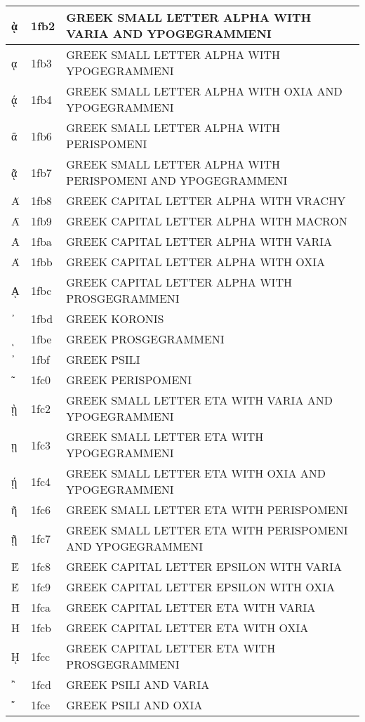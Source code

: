 \documentclass[12pt,letterpaper,openany]{book}
\begin{document}
\begin{center}
\begin{supertabular}{|m{0.25in}|m{0.5in}|m{4in}|}
			ᾲ & 1fb2 & GREEK SMALL LETTER ALPHA WITH VARIA AND YPOGEGRAMMENI\\\hline
			ᾳ & 1fb3 & GREEK SMALL LETTER ALPHA WITH YPOGEGRAMMENI\\\hline
			ᾴ & 1fb4 & GREEK SMALL LETTER ALPHA WITH OXIA AND YPOGEGRAMMENI\\\hline
			ᾶ & 1fb6 & GREEK SMALL LETTER ALPHA WITH PERISPOMENI\\\hline
			ᾷ & 1fb7 & GREEK SMALL LETTER ALPHA WITH PERISPOMENI AND YPOGEGRAMMENI\\\hline
			Ᾰ & 1fb8 & GREEK CAPITAL LETTER ALPHA WITH VRACHY\\\hline
			Ᾱ & 1fb9 & GREEK CAPITAL LETTER ALPHA WITH MACRON\\\hline
			Ὰ & 1fba & GREEK CAPITAL LETTER ALPHA WITH VARIA\\\hline
			Ά & 1fbb & GREEK CAPITAL LETTER ALPHA WITH OXIA\\\hline
			ᾼ & 1fbc & GREEK CAPITAL LETTER ALPHA WITH PROSGEGRAMMENI\\\hline
			᾽ & 1fbd & GREEK KORONIS\\\hline
			ι & 1fbe & GREEK PROSGEGRAMMENI\\\hline
			᾿ & 1fbf & GREEK PSILI\\\hline
			῀ & 1fc0 & GREEK PERISPOMENI\\\hline
			ῂ & 1fc2 & GREEK SMALL LETTER ETA WITH VARIA AND YPOGEGRAMMENI\\\hline
			ῃ & 1fc3 & GREEK SMALL LETTER ETA WITH YPOGEGRAMMENI\\\hline
			ῄ & 1fc4 & GREEK SMALL LETTER ETA WITH OXIA AND YPOGEGRAMMENI\\\hline
			ῆ & 1fc6 & GREEK SMALL LETTER ETA WITH PERISPOMENI\\\hline
			ῇ & 1fc7 & GREEK SMALL LETTER ETA WITH PERISPOMENI AND YPOGEGRAMMENI\\\hline
			Ὲ & 1fc8 & GREEK CAPITAL LETTER EPSILON WITH VARIA\\\hline
			Έ & 1fc9 & GREEK CAPITAL LETTER EPSILON WITH OXIA\\\hline
			Ὴ & 1fca & GREEK CAPITAL LETTER ETA WITH VARIA\\\hline
			Ή & 1fcb & GREEK CAPITAL LETTER ETA WITH OXIA\\\hline
			ῌ & 1fcc & GREEK CAPITAL LETTER ETA WITH PROSGEGRAMMENI\\\hline
			῍ & 1fcd & GREEK PSILI AND VARIA\\\hline
			῎ & 1fce & GREEK PSILI AND OXIA\\\hline

\end{supertabular}
\end{center}
\end{document}
